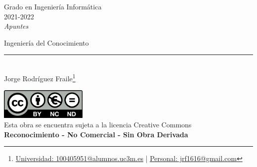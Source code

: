 \documentclass[12pt, twoside, openright]{report} %
\begin{document}

\begin{titlepage}
	\begin{sffamily}
		\color{azulUC3M}
		\begin{center}
			\begin{figure}[H] %
			\end{figure}
			\vspace{2.5cm}
			\begin{Large}
				Grado en Ingeniería Informática\\
				2021-2022\\
				\vspace{2cm}
				\textsl{Apuntes}\\
				\bigskip
			\end{Large}
			{\Huge Ingeniería del Conocimiento}\\
			\vspace*{0.5cm}
			\rule{10.5cm}{0.1mm}\\
			\vspace*{0.9cm}
			{\LARGE Jorge Rodríguez Fraile\footnote{\href{mailto:100405951@alumnos.uc3m.es}{Universidad: 100405951@alumnos.uc3m.es}  |  \href{mailto:jrf1616@gmail.com}{Personal: jrf1616@gmail.com}}}\\
			\vspace*{1cm}
		\end{center}
		\vfill
		\color{black}
		\includegraphics[width=4.2cm]{img/creativecommons.png}\\
		Esta obra se encuentra sujeta a la licencia Creative Commons\\ \textbf{Reconocimiento - No Comercial - Sin Obra Derivada}
	\end{sffamily}
\end{titlepage}


\tableofcontents
\thispagestyle{fancy}
\end{document}
